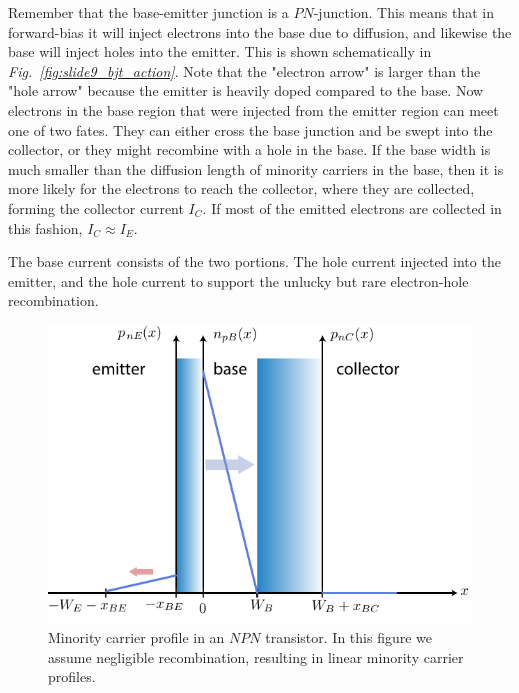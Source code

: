 Remember that the base-emitter junction is a $PN$-junction.  This means that in forward-bias it will inject electrons into the base due to diffusion, and likewise the base will inject holes into the emitter.  This is shown schematically in \emph{Fig.~\ref{fig:slide9_bjt_action}}.  Note that the "electron arrow" is larger than the "hole arrow" because the emitter is heavily doped compared to the base.  Now electrons in the base region that were injected from the emitter region can meet one of two fates.  They can either cross the base junction and be swept into the collector, or they might recombine with a hole in the base.  If the base width is much smaller than the diffusion length of minority carriers in the base, then it is more likely for the electrons to reach the collector, where they are collected, forming the collector current $I_C$.  If most of the emitted electrons are collected in this fashion, $I_C \approx I_E$. 

The base current consists of the two portions.  The hole current injected into the emitter, and the hole current to support the unlucky but rare electron-hole recombination.
\begin{figure}[t]
\centering
\includegraphics[width=\columnwidth]{slide10_minority_carriers}
\caption{Minority carrier profile in an $NPN$ transistor.  In this figure we assume negligible recombination, resulting in linear minority carrier profiles.}
\label{fig:slide10_minority_carriers}
\end{figure}
